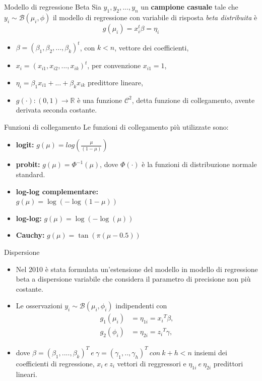 \documentclass[usenames,dvipsnames]{beamer}
\begin{document}
\begin{frame}{Modello di regressione Beta}
Sia $y_1,y_2,...,y_n$ un \textbf{campione casuale} tale che $y_i \sim \mathcal{B}(\mu_i,\phi)$ 
il modello di regressione con variabile di risposta \emph{beta distribuita} è
$$g(\mu_i)=x_i ^t \beta=\eta_i $$
\begin{itemize}[<+->]
	\item $\beta=(\beta_1, \beta_2, ..., \beta_k)^t$, con $k<n$, vettore dei coefficienti,
	\item $x_i=(x_{i1}, x_{i2},...,x_{ik})^t$, per convenzione $x_{i1}=1$,
	\item $\eta_i=\beta_1x_{i1}+...+\beta_kx_{ik}$ predittore lineare,
	\item $g(\cdot):(0,1)\rightarrow\mathbb{R}$ è una funzione $\mathcal{C}^2$, detta funzione di collegamento, avente derivata seconda costante.
\end{itemize}
\end{frame}

\begin{frame}{Funzioni di collegamento}
\vspace{0.5cm}
\hspace{0.5cm}
Le funzioni di collegamento più utilizzate sono:
\begin{itemize}
\item \textbf{logit:} $g(\mu)=log(\frac{\mu}{(1-\mu)}) $
\item \textbf{probit:} $g(\mu)=\varPhi^{-1}(\mu)$, dove $\varPhi(\cdot)$ è la funzioni di distribuzione normale standard.
\item \textbf{log-log complementare:}\\ $g(\mu)=\log(-\log(1-\mu))$
\item \textbf{log-log:} $g(\mu)=\log(-\log(\mu))$
\item \textbf{Cauchy:} $g(\mu)=\tan(\pi(\mu-0.5))$
\end{itemize}
\end{frame}

\begin{frame}{Dispersione}
\begin{itemize}
\item[] Nel 2010 è stata formulata un'estensione del modello in
modello di regressione beta a dispersione variabile che considera il parametro di precisione non più costante.
\item[] Le osservazioni $y_i \sim \mathbb{\mathcal{B}}(\mu_i, \phi_i)$ indipendenti con 
\begin{align*}
g_1(\mu_i)&=\eta_{1i}=x{_i}^T \beta,\\ %
g_2(\phi_i)&=\eta_{2i}=z{_i}^T \gamma,%
\end{align*}
\item[] dove $\beta=(\beta_1,....,\beta_k)^T  \  e \ \gamma=(\gamma_1,..,\gamma_h)^T \ con \  k+h<n$ insiemi dei coefficienti di regressione, $x_i \ e \ z_i$ vettori di reggressori e $\eta_{1i} \ e \ \eta_{2i} $ predittori lineari. 
\end{itemize}
\end{frame}
\end{document}
